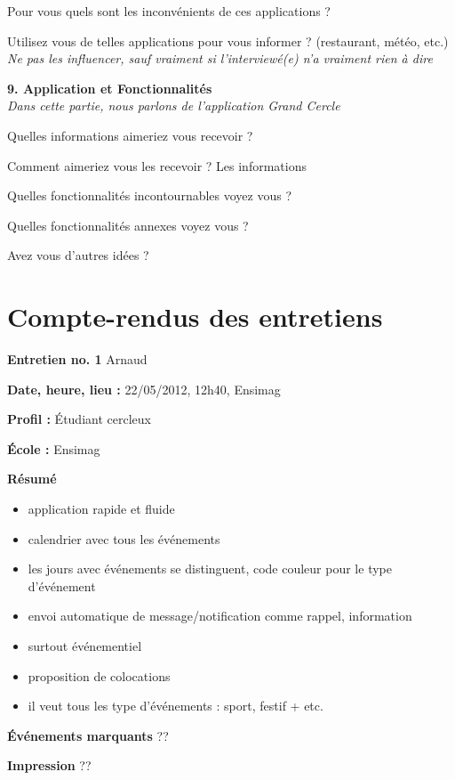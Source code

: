 \documentclass[a4paper, 11px]{article}
\begin{document}
Pour vous quels sont les inconvénients de ces applications ?

Utilisez vous de telles applications pour vous informer ? (restaurant, météo, etc.)
\textit {Ne pas les influencer, sauf vraiment si l'interviewé(e) n'a vraiment rien à dire}


\vspace{.3cm}

 \textbf {\large 9. Application et Fonctionnalités}\\
\textit{Dans cette partie, nous parlons de l'application Grand Cercle}

Quelles informations aimeriez vous recevoir ?


Comment aimeriez vous les recevoir ?
Les informations


Quelles fonctionnalités incontournables voyez vous ?


Quelles fonctionnalités annexes voyez vous ?


Avez vous d'autres idées ?

\newpage

\section{Compte-rendus des entretiens}

 \textbf {\large Entretien no. 1}
Arnaud

\textbf{Date, heure, lieu : }
22/05/2012, 12h40, Ensimag

\textbf{Profil : }
Étudiant cercleux

\textbf{École : }
Ensimag

\textbf{Résumé}
	\begin{itemize}
		\item application rapide et fluide
		\item calendrier avec tous les événements
		\item les jours avec événements se distinguent, code couleur pour le type d'événement
		\item envoi automatique de message/notification comme rappel, information
		\item surtout événementiel
		\item proposition de colocations
		\item il veut tous les type d'événements : sport, festif + etc.
	\end{itemize}

\textbf{Événements marquants}
??

\textbf{Impression}
??
\end{document}
